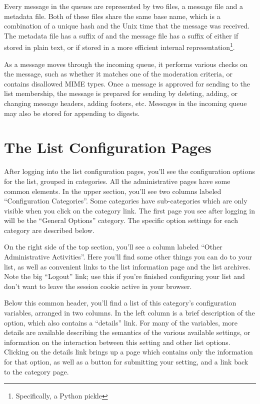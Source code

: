 \documentclass{howto}
\begin{document}
Every message in the queues are represented by two files, a message
file and a metadata file.  Both of these files share the same base
name, which is a combination of a unique hash and the Unix time that
the message was received.  The metadata file has a suffix of
 and the message file has a suffix of either  if
stored in plain text, or  if stored in a more efficient
internal representation\footnote{Specifically, a Python pickle}.

As a message moves through the incoming queue, it performs various
checks on the message, such as whether it matches one of the
moderation criteria, or contains disallowed MIME types.  Once a
message is approved for sending to the list membership, the message is
prepared for sending by deleting, adding, or changing message headers,
adding footers, etc.  Messages in the incoming queue may also be
stored for appending to digests.

\section{The List Configuration Pages}

After logging into the list configuration pages, you'll see the
configuration options for the list, grouped in categories.  All the
administrative pages have some common elements.  In the upper section,
you'll see two columns labeled ``Configuration Categories''.  Some
categories have sub-categories which are only visible when you click
on the category link.  The first page you see after logging in will be
the ``General Options'' category.  The specific option settings for
each category are described below.

On the right side of the top section, you'll see a column labeled
``Other Administrative Activities''.  Here you'll find some other
things you can do to your list, as well as convenient links to the
list information page and the list archives.  Note the big ``Logout''
link; use this if you're finished configuring your list and don't want
to leave the session cookie active in your browser.

Below this common header, you'll find a list of this category's
configuration variables, arranged in two columns.  In the left column
is a brief description of the option, which also contains a
``details'' link.  For many of the variables, more details are
available describing the semantics of the various available settings,
or information on the interaction between this setting and other list
options.  Clicking on the details link brings up a page which contains
only the information for that option, as well as a button for
submitting your setting, and a link back to the category page.
\end{document}
